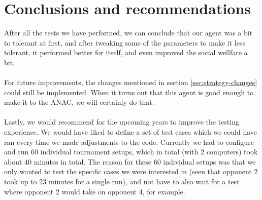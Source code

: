\section{Conclusions and recommendations}
After all the tests we have performed, we can conclude that our agent was a bit to tolerant at first, and after tweaking some of the parameters to make it less tolerant, it performed better for itself, and even improved the social wellfare a bit.
\\\\
For future improvements, the changes mentioned in section \ref{sec:strategy-changes} could still be implemented. When it turns out that this agent is good enough to make it to the ANAC, we will certainly do that.
\\\\
Lastly, we would recommend for the upcoming years to improve the testing experience. We would have liked to define a set of test cases which we could have ran every time we made adjustments to the code. Currently we had to configure and run 60 individual tournament setups, which in total (with 2 computers) took about 40 minutes in total. The reason for these 60 individual setups was that we only wanted to test the specific cases we were interested in (seen that opponent 2 took up to 23 minutes for a single run), and not have to also wait for a test where opponent 2 would take on opponent 4, for example.